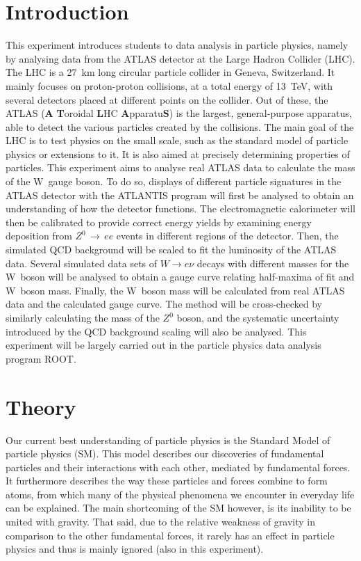 \documentclass[twocolumn]{article}
\begin{document}
\section{Introduction}
This experiment introduces students to data analysis in particle physics, namely by analysing data from the ATLAS detector at the Large Hadron Collider (LHC). The LHC is a 27~km long circular particle collider in Geneva, Switzerland. It mainly focuses on proton-proton collisions, at a total energy of 13~TeV, with several detectors placed at different points on the collider. Out of these, the ATLAS (\textbf{A} \textbf{T}oroidal \textbf{L}HC \textbf{A}pparatu\textbf{S}) is the largest, general-purpose apparatus, able to detect the various particles created by the collisions. The main goal of the LHC is to test physics on the small scale, such as the standard model of particle physics or extensions to it. It is also aimed at precisely determining properties of particles. This experiment aims to analyse real ATLAS data to calculate the mass of the W~gauge boson. To do so, displays of different particle signatures in the ATLAS detector with the ATLANTIS program will first be analysed to obtain an understanding of how the detector functions. The electromagnetic calorimeter will then be calibrated to provide correct energy yields by examining energy deposition from $Z^0 \, \rightarrow \, ee$ events in different regions of the detector. Then, the simulated QCD background will be scaled to fit the luminosity of the ATLAS data. Several simulated data sets of $W \to e\nu$ decays with different masses for the W~boson will be analysed to obtain a gauge curve relating half-maxima of fit and W~boson mass. Finally, the W~boson mass will be calculated from real ATLAS data and the calculated gauge curve. The method will be cross-checked by similarly calculating the mass of the $Z^0$ boson, and the systematic uncertainty introduced by the QCD background scaling will also be analysed. This experiment will be largely carried out in the particle physics data analysis program ROOT.

\section{Theory}
Our current best understanding of particle physics is the Standard Model of particle physics (SM). This model describes our discoveries of fundamental particles and their interactions with each other, mediated by fundamental forces. It furthermore describes the way these particles and forces combine to form atoms, from which many of the physical phenomena we encounter in everyday life can be explained. The main shortcoming of the SM however, is its inability to be united with gravity. That said, due to the relative weakness of gravity in comparison to the other fundamental forces, it rarely has an effect in particle physics and thus is mainly ignored (also in this experiment).
\end{document}
